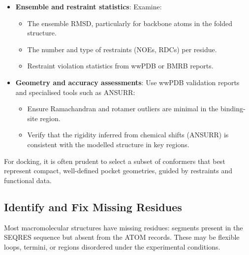 \documentclass[12pt]{article}
\begin{document}
\begin{itemize}
  \item \textbf{Ensemble and restraint statistics}: Examine:

\begin{itemize}

  \item The ensemble RMSD, particularly for backbone atoms in the folded structure.
  \item The number and type of restraints (NOEs, RDCs) per residue.
  \item Restraint violation statistics from wwPDB or BMRB reports.\cite{CH4_baskaran2024restraint}

\end{itemize}

  \item \textbf{Geometry and accuracy assessments}: Use wwPDB validation reports and specialised tools such as ANSURR:\cite{CH4_fowler2020method,CH4_Williams2018_MolProbity}

\begin{itemize}
  \item Ensure Ramachandran and rotamer outliers are minimal in the binding-site region.
  \item Verify that the rigidity inferred from chemical shifts (ANSURR) is consistent with the modelled structure in key regions.\cite{CH4_fowler2020method}
\end{itemize}
\end{itemize}

For docking, it is often prudent to select a subset of conformers that best represent compact, well-defined pocket geometries, guided by restraints and functional data.

\subsection{Identify and Fix Missing Residues}
Most macromolecular structures have missing residues: segments present in the SEQRES sequence but absent from the ATOM records. These may be flexible loops, termini, or regions disordered under the experimental conditions.
\end{document}
